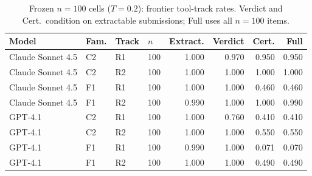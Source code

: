\begin{table}[t]
  \centering
  \caption{Frozen $n{=}100$ cells ($T{=}0.2$): frontier tool-track rates. Verdict and Cert.\ condition on extractable submissions; Full uses all $n{=}100$ items.}
  \label{tab:frontier-tools-comparison-n100}
  \setlength{\tabcolsep}{3pt}
  \begin{tabular}{@{}llllrrrr@{}}
    \toprule
    Model & Fam. & Track & $n$ & Extract. & Verdict & Cert. & Full \\
    \midrule
    Claude Sonnet 4.5 & C2 & R1 & 100 & 1.000 & 0.970 & 0.950 & 0.950 \\
    Claude Sonnet 4.5 & C2 & R2 & 100 & 1.000 & 1.000 & 1.000 & 1.000 \\
    Claude Sonnet 4.5 & F1 & R1 & 100 & 1.000 & 1.000 & 0.460 & 0.460 \\
    Claude Sonnet 4.5 & F1 & R2 & 100 & 0.990 & 1.000 & 1.000 & 0.990 \\
    \midrule
    GPT-4.1 & C2 & R1 & 100 & 1.000 & 0.760 & 0.410 & 0.410 \\
    GPT-4.1 & C2 & R2 & 100 & 1.000 & 1.000 & 0.550 & 0.550 \\
    GPT-4.1 & F1 & R1 & 100 & 0.990 & 1.000 & 0.071 & 0.070 \\
    GPT-4.1 & F1 & R2 & 100 & 1.000 & 1.000 & 0.490 & 0.490 \\
    \bottomrule
  \end{tabular}
\end{table}
